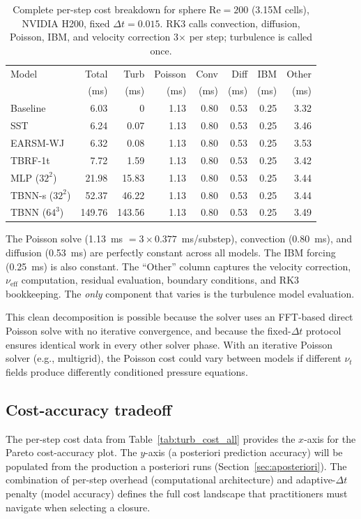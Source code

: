 \begin{table}[htbp]
\centering
\caption{Complete per-step cost breakdown for sphere Re$=200$ (3.15M cells), NVIDIA H200, fixed $\Delta t = 0.015$. RK3 calls convection, diffusion, Poisson, IBM, and velocity correction 3$\times$ per step; turbulence is called once.}
\label{tab:breakdown_sphere}
\begin{tabular}{lrrrrrrr}
\toprule
Model & Total & Turb & Poisson & Conv & Diff & IBM & Other \\
      & (ms)  & (ms) & (ms)    & (ms) & (ms) & (ms)& (ms) \\
\midrule
Baseline        &  6.03 &  0     & 1.13 & 0.80 & 0.53 & 0.25 & 3.32 \\
SST             &  6.24 &  0.07  & 1.13 & 0.80 & 0.53 & 0.25 & 3.46 \\
EARSM-WJ       &  6.32 &  0.08  & 1.13 & 0.80 & 0.53 & 0.25 & 3.53 \\
TBRF-1t         &  7.72 &  1.59  & 1.13 & 0.80 & 0.53 & 0.25 & 3.42 \\
MLP ($32^2$)    & 21.98 & 15.83  & 1.13 & 0.80 & 0.53 & 0.25 & 3.44 \\
TBNN-s ($32^2$) & 52.37 & 46.22  & 1.13 & 0.80 & 0.53 & 0.25 & 3.44 \\
TBNN ($64^3$)   &149.76 &143.56  & 1.13 & 0.80 & 0.53 & 0.25 & 3.49 \\
\bottomrule
\end{tabular}
\end{table}

The Poisson solve (1.13~ms $= 3 \times 0.377$~ms/substep), convection (0.80~ms), and diffusion (0.53~ms) are perfectly constant across all models.
The IBM forcing (0.25~ms) is also constant.
The ``Other'' column captures the velocity correction, $\nu_\mathrm{eff}$ computation, residual evaluation, boundary conditions, and RK3 bookkeeping.
The \emph{only} component that varies is the turbulence model evaluation.

This clean decomposition is possible because the solver uses an FFT-based direct Poisson solve with no iterative convergence, and because the fixed-$\Delta t$ protocol ensures identical work in every other solver phase.
With an iterative Poisson solver (e.g., multigrid), the Poisson cost could vary between models if different $\nu_t$ fields produce differently conditioned pressure equations.

\subsection{Cost-accuracy tradeoff}
\label{sec:pareto}

The per-step cost data from Table~\ref{tab:turb_cost_all} provides the $x$-axis for the Pareto cost-accuracy plot.
The $y$-axis (a posteriori prediction accuracy) will be populated from the production a posteriori runs (Section~\ref{sec:aposteriori}).
The combination of per-step overhead (computational architecture) and adaptive-$\Delta t$ penalty (model accuracy) defines the full cost landscape that practitioners must navigate when selecting a closure.
